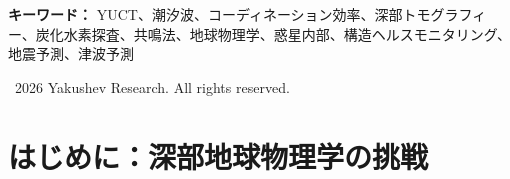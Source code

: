 \documentclass[12pt,a4paper]{article}
\theoremstyle{remark}
\newcommand{\Keff}{K_{\mathrm{eff}}}
\newcommand{\kappac}{\kappa_c}
\newcommand{\eps}{\varepsilon}
\begin{document}
\begin{titlepage}
\begin{center}
			\begin{minipage}{0.9\textwidth}
				\begin{abstract}
					\noindent
					本付録は、月と太陽による潮汐重力強制力に対する地殻の共鳴応答の解析に基づく、新たな受動的地球物理探査法を導入する。Yakushev統一コーディネーション理論（YUCT）の枠組みの中で、潮汐変形のスペクトルが、岩石種別、流体含有量（石油・ガス・水）、鉱体に直接関連するコーディネーション効率 \(\Keff\) の地下分布に関する情報を含むことを示す。我々は、普遍的誤差スケーリング則 \(\eps = \kappac \alpha \Keff^{-\beta}\) (\(\beta=0.67\), \(\kappac=0.33\)) と、YUCTセクター0（重力）およびセクター34（惑星科学）からの重力場と弾性変形の結合方程式を活用し、地表の重力測定および地震測定を \(\Keff\) の深度分布に結びつける数学モデルを構築する。潮汐波が、能動的な震源では到達不可能な浸透深度を持ち、安価で環境に優しく、全地球的に適用可能な探査法を提供することを示す。潮汐共鳴の直接観測や、重力潮汐を用いた炭化水素探査の提案など、本アプローチの要素を先取りする独立した研究を概観する。元素周期表に類似したコーディネーションに基づく鉱物・流体分類システムに基づき、特徴的な共鳴周波数と品質係数によって炭化水素を同定する方法論を提案する。空井戸掘削リスクの20–30\%低減が展開コストを何倍にも回収することを評価し、経済的実行可能性を評価する。さらに、工学的構造物（超高層ビル、橋、ダム）の構造ヘルスモニタリング、地震予測、津波予測へと方法論を拡張し、同じ物理原理が数百万人の命と数兆ドルを救う可能性を持つ革新的な受動的監視技術の新たなクラスを可能にすることを示す。この結果は、自然の重力場を利用した根本的に新しい探査・監視技術への道を開く。
				\end{abstract}
			\end{minipage}
			
			\vspace{1cm}
			
			\noindent
			\small\textbf{キーワード：} YUCT、潮汐波、コーディネーション効率、深部トモグラフィー、炭化水素探査、共鳴法、地球物理学、惑星内部、構造ヘルスモニタリング、地震予測、津波予測
			
			\vspace{0.5cm}
			
			\noindent
			\textcopyright\ 2026 Yakushev Research. All rights reserved.
		\end{center}
	\end{titlepage}
	
	\tableofcontents
	\newpage
	
	\section{はじめに：深部地球物理学の挑戦}
	\label{sec:intro}
	
\end{document}

